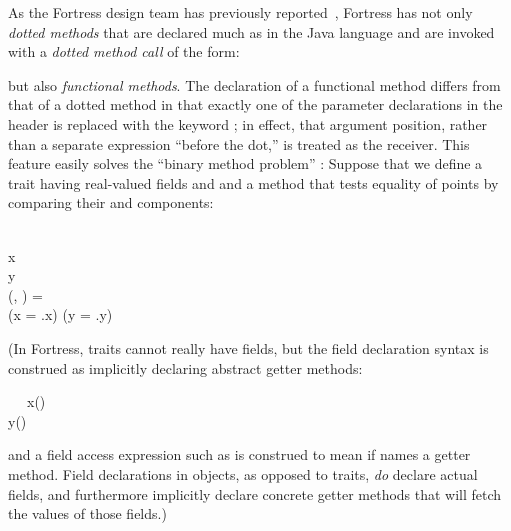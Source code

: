 As the Fortress design team has previously reported~\cite{FORTRESS-MODULAR-MULTIPLE-DISPATCH},
Fortress has not only \emph{dotted methods} that
are declared much as in the Java language and are invoked with a 
\emph{dotted method call} of the form:
\begin{codeexamplesize}
\begin{tabbing}
\end{tabbing}
\end{codeexamplesize}
but also \emph{functional methods}.  The declaration
of a functional method differs from that of a dotted method
in that exactly one of the parameter  declarations
in the header is replaced with the keyword ; in effect,
that argument position, rather than a separate expression
``before the dot,'' is treated as the receiver.
This feature easily solves the ``binary method problem'' \cite{BRUCE-ON-BINARY-METHODS}:
Suppose that we define a trait  having real-valued fields  and  and a method that tests equality
of points by comparing their  and  components:
\begin{codeexamplesize}
\begin{FortressCode}
  \\
\2\+x\COLON {} \\
  y\COLON {} \\
  (, \COLON {})\COLON {} = \\
  \2\+(x = .x) \wedge (y = .y)\-\- \\
\end{FortressCode}
\end{codeexamplesize}
(In Fortress, traits cannot really have fields, but the field declaration syntax
is construed as implicitly declaring abstract getter methods:
\begin{codeexamplesize}
\begin{FortressCode}
{\tt ~~}\+ x(\ultrathin)\COLON {} \\
   y(\ultrathin)\COLON {}\-
\end{FortressCode}
\end{codeexamplesize}
and a field access expression such as  is construed to mean 
if  names a getter method.  Field declarations in objects,
as opposed to traits, \emph{do} declare actual fields, and furthermore
implicitly declare concrete getter methods that will fetch the values of
those fields.)

